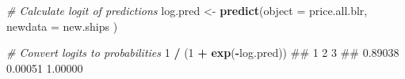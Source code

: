 \documentclass[]{book}
\newenvironment{Shaded}{\begin{snugshade}}{\end{snugshade}}
\newcommand{\KeywordTok}[1]{\textcolor[rgb]{0.13,0.29,0.53}{\textbf{#1}}}
\newcommand{\DataTypeTok}[1]{\textcolor[rgb]{0.13,0.29,0.53}{#1}}
\newcommand{\DecValTok}[1]{\textcolor[rgb]{0.00,0.00,0.81}{#1}}
\newcommand{\StringTok}[1]{\textcolor[rgb]{0.31,0.60,0.02}{#1}}
\newcommand{\CommentTok}[1]{\textcolor[rgb]{0.56,0.35,0.01}{\textit{#1}}}
\newcommand{\OperatorTok}[1]{\textcolor[rgb]{0.81,0.36,0.00}{\textbf{#1}}}
\newcommand{\NormalTok}[1]{#1}
\theoremstyle{definition}
\theoremstyle{definition}
\theoremstyle{remark}
\begin{document}
\begin{Shaded}
\begin{Highlighting}[]
\CommentTok{# Calculate logit of predictions}
\NormalTok{log.pred <-}\StringTok{ }\KeywordTok{predict}\NormalTok{(}\DataTypeTok{object =}\NormalTok{ price.all.blr,}
                    \DataTypeTok{newdata =}\NormalTok{ new.ships}
\NormalTok{                    )}

\CommentTok{# Convert logits to probabilities}
\DecValTok{1} \OperatorTok{/}\StringTok{ }\NormalTok{(}\DecValTok{1} \OperatorTok{+}\StringTok{ }\KeywordTok{exp}\NormalTok{(}\OperatorTok{-}\NormalTok{log.pred))}
\NormalTok{##       1       2       3 }
\NormalTok{## 0.89038 0.00051 1.00000}
\end{Highlighting}
\end{Shaded}


\end{document}
